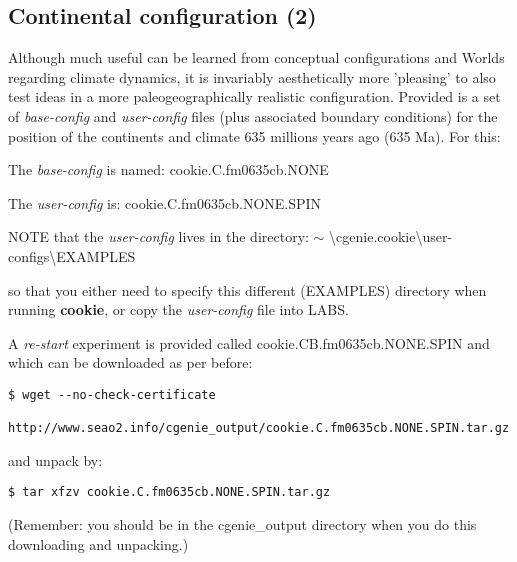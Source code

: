 
\subsection{Continental configuration (2)}

Although much useful can be learned from conceptual configurations and Worlds regarding climate dynamics, it is invariably aesthetically more 'pleasing' to also test ideas in a more paleogeographically realistic configuration. Provided is a set of \textit{base-config} and \textit{user-config} files (plus associated boundary conditions) for the position of the continents and climate 635 millions years ago (635 Ma). For this:

\vspace{1mm}
The \textit{base-config} is named: \textsf{\footnotesize cookie.C.fm0635cb.NONE}

\vspace{1mm}
The \textit{user-config} is: \textsf{\footnotesize cookie.C.fm0635cb.NONE.SPIN}

\vspace{1mm}
NOTE that the \textit{user-config} lives in the directory: \textsf{\footnotesize \(\sim\) \textbackslash cgenie.cookie\textbackslash user-configs\textbackslash EXAMPLES}

\noindent so that you either need to specify this different (\textsf{\footnotesize EXAMPLES}) directory when running \textbf{cookie}, or copy the \textit{user-config} file into \textsf{\footnotesize LABS}.

\vspace{1mm}
A \textit{re-start }experiment is provided called \textsf{\footnotesize cookie.CB.fm0635cb.NONE.SPIN} and which can be downloaded as per before:

\vspace{-2mm}\small\begin{verbatim}
$ wget --no-check-certificate 
  http://www.seao2.info/cgenie_output/cookie.C.fm0635cb.NONE.SPIN.tar.gz
\end{verbatim}\normalsize\vspace{-2mm}
and unpack by:

\vspace{-2mm}\small\begin{verbatim}
$ tar xfzv cookie.C.fm0635cb.NONE.SPIN.tar.gz
\end{verbatim}\normalsize\vspace{-2mm}
(Remember: you should be in the \textsf{\footnotesize cgenie\_output} directory when you do this downloading and unpacking.)

